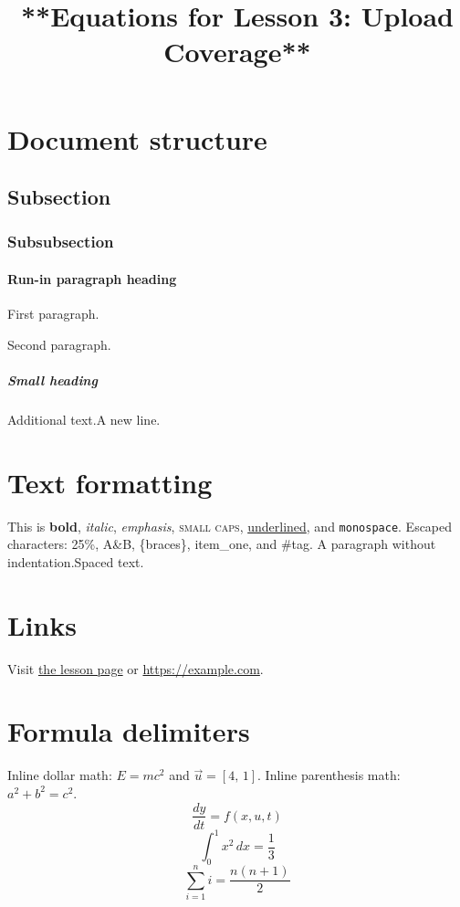 \documentclass{article}
\title{\textbf{**Equations for Lesson 3: Upload Coverage**}}
\author{}
\date{}
\begin{document}
\maketitle
\vspace{-2em}

\section{Document structure}\label{sec:structure}
\subsection{Subsection}
\subsubsection{Subsubsection}
\paragraph{Run-in paragraph heading}First paragraph.\par Second paragraph.
\subparagraph{Small heading}Additional text.\newline A new line.

\section{Text formatting}
This is \textbf{bold}, \textit{italic}, \emph{emphasis},
\textsc{small caps}, \underline{underlined}, and \texttt{monospace}.
Escaped characters: 25\%, A\&B, \{braces\}, item\_one, and \#tag.
\noindent A paragraph without indentation.\quad Spaced text.
\smallskip

\section{Links}
Visit \href{https://example.com/lesson}{the lesson page} or \url{https://example.com}.

\section{Formula delimiters}
Inline dollar math: $E=mc^2$ and $\vec{u}=[4,\,1]$.
Inline parenthesis math: \(a^2+b^2=c^2\).
\[
  \frac{dy}{dt}=f(x,u,t)
\]
\begin{equation}
  \int_0^1 x^2\,dx=\frac{1}{3}
\end{equation}
\begin{displaymath}
  \sum_{i=1}^{n}i=\frac{n(n+1)}{2}
\end{displaymath}
\end{document}
